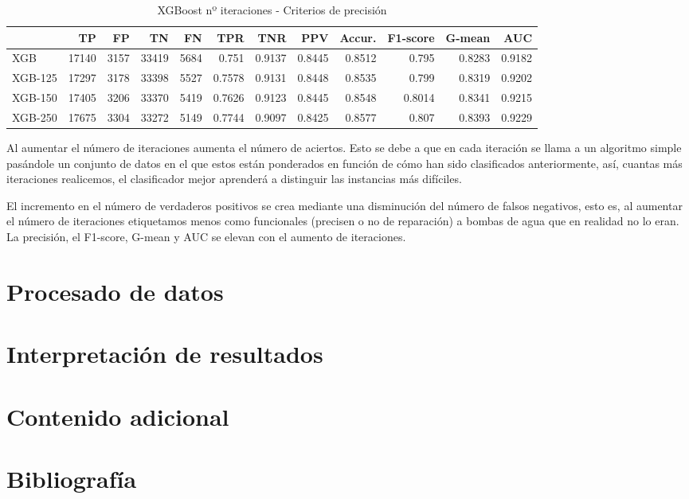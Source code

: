 \documentclass[a4paper, 20pt]{article}
\begin{document}
\begin{table}[H]
\centering
\caption{XGBoost nº iteraciones - Criterios de precisión}
\label{tab:}
\begin{tabular}{lrrrrrrrrrrr}
\toprule
 & TP & FP & TN & FN & TPR & TNR & PPV & Accur. & F1-score & G-mean & AUC\\ \midrule
XGB & 17140 & 3157 & 33419 & 5684 & 0.751 & 0.9137 & 0.8445 & 0.8512 & 0.795 & 0.8283 & 0.9182\\
XGB-125 & 17297 & 3178 & 33398 & 5527 & 0.7578 & 0.9131 & 0.8448 & 0.8535 & 0.799 & 0.8319 & 0.9202\\
XGB-150 & 17405 & 3206 & 33370 & 5419 & 0.7626 & 0.9123 & 0.8445 & 0.8548 & 0.8014 & 0.8341 & 0.9215\\
XGB-250 & 17675 & 3304 & 33272 & 5149 & 0.7744 & 0.9097 & 0.8425 & 0.8577 & 0.807 & 0.8393 & 0.9229\\
\bottomrule
\end{tabular}
\end{table}

Al aumentar el número de iteraciones aumenta el número de aciertos. Esto se debe a que en cada iteración se llama a un algoritmo simple pasándole un conjunto de datos en el que estos están ponderados en función de cómo han sido clasificados anteriormente, así, cuantas más iteraciones realicemos, el clasificador mejor aprenderá a distinguir las instancias más difíciles.

El incremento en el número de verdaderos positivos se crea mediante una disminución del número de falsos negativos, esto es, al aumentar el número de iteraciones etiquetamos menos como funcionales (precisen o no de reparación) a bombas de agua que en realidad no lo eran. La precisión, el F1-score, G-mean y AUC se elevan con el aumento de iteraciones.

\section{Procesado de datos}
\label{Preprocesado}
\section{Interpretación de resultados}

\section{Contenido adicional}
\section{Bibliografía}
\label{ref:XGB}%
\end{document}
